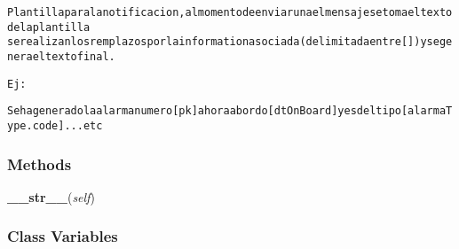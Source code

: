 \begin{alltt}

Plantilla para la notificacion, al momento de enviar una el mensaje se toma el texto de la plantilla
se realizan los remplazos por la information asociada (delimitada entre [])  y se genera el texto final.

Ej:

    Se ha generado la alarma numero [pk] a hora abordo [dtOnBoard] y es del tipo [alarmaType.code]...etc
\end{alltt}



  \subsubsection{Methods}

    \label{GroundSegment:models:Notification:MessageTemplate:MessageTemplate:__str__}

    \vspace{0.5ex}

\hspace{.8\funcindent}\begin{boxedminipage}{\funcwidth}

    \raggedright \textbf{\_\_str\_\_}(\textit{self})

\setlength{\parskip}{2ex}
\setlength{\parskip}{1ex}
    \end{boxedminipage}



  \subsubsection{Class Variables}

